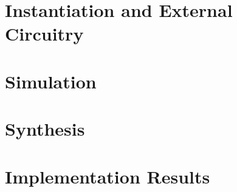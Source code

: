 \documentclass{\TEX/ug/ug}
\begin{document}
\section{Instantiation and External Circuitry}
\label{sec:inst}


\section{Simulation}
\label{sec:tbbd}


\section{Synthesis}
\label{sec:synth}


\section{Implementation Results}
\label{sec:results}


\ifdefined\CUSTOM

\fi
\end{document}
